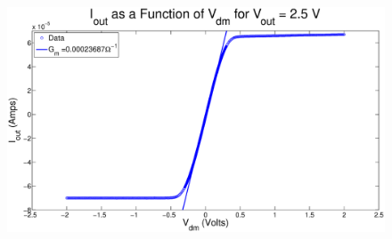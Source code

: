 \begin{figure}[H]
\centering
\includegraphics[width=\linewidth]{../Figures/Exp2P3.eps}
\caption{}
\label{fig:exp2p3}
\end{figure}